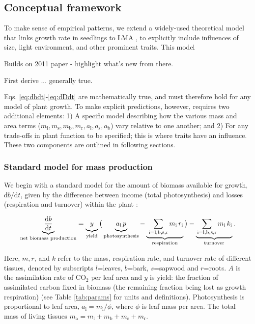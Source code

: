 \documentclass[12pt, a4paper]{article}
\begin{document}
\subsection{Conceptual framework}\label{conceptual-framework}

To make sense of empirical patterns, we extend a widely-used theoretical model that links growth rate in
seedlings to LMA \citep{lambers-1992, wright_cross-2000}, to explicitly include influences of
size, light environment, and other prominent traits. This model

Builds on 2011 paper - highlight what's new from there.

First derive ... generally true.

Eqs. \ref{eq:dhdt}-\ref{eq:dDdt} are mathematically true, and must
therefore hold for any model of plant growth. To make explicit
predictions, however, requires two additional elements: 1) A specific
model describing how the various mass and area terms
($m_\textrm{l}, m_\textrm{s}, m_\textrm{b}, m_\textrm{r}, a_\textrm{l}, a_\textrm{s}, a_\textrm{b}$)
vary relative to one another; and 2) For any trade-offs in plant
function to be specified; this is where traits have an influence.  These two components are outlined in following sections.

\subsubsection{Standard model for mass production}

We begin with a standard model for the amount of biomass available for
growth, $\textrm{d}b / \textrm{d}t$, given by the difference between income
(total photosynthesis) and losses (respiration and turnover) within the
plant \citep{makela-1997, Thornley-2000, falster-2011}:

\begin{equation}\label{eq:dbdt}
\underbrace{\strut \frac{\textrm{d}b}{\textrm{d}t}}_\textrm{net biomass production}
  = \underbrace{\strut y}_\textrm{yield}
    \big( \underbrace{\strut a_\textrm{l} \, p}_\textrm{photosynthesis} -
     \underbrace{\strut \,\sum_\textrm{i=l,b,s,r}{m_\textrm{i} \, r_\textrm{i}}}_\textrm{respiration}\big)
    - \underbrace{\strut \sum_\textrm{i=l,b,s,r}{m_\textrm{i} \, k_\textrm{i}}}_\textrm{turnover}.
\end{equation}

Here, $m,r$, and $k$ refer to the mass, respiration rate, and
turnover rate of different tissues, denoted by subscripts $l$=leaves,
$b$=bark, $s$=sapwood and $r$=roots. $A$ is the assimilation
rate of CO$_2$ per leaf area and $y$ is yield: the fraction of
assimilated carbon fixed in biomass (the remaining fraction being lost
as growth respiration) (see Table \ref{tab:params} for units and
definitions). Photosynthesis is proportional to leaf area,
$a_\textrm{l} = m_\textrm{l} / \phi$, where $\phi$ is leaf mass per area.
The total mass of living tissues $m_\textrm{a}=m_\textrm{l}+m_\textrm{b}+m_\textrm{s}+m_\textrm{r}.$
\end{document}
